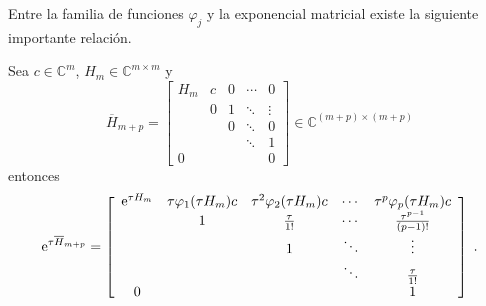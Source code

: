 Entre la familia de funciones $\varphi_j$ y la exponencial matricial existe la siguiente importante relación.
\begin{theorem}\label{theorem:exp-phi}
    \cite{sidje1998expokit} Sea $c\in\mathbb{C}^{m}$, $H_m\in\mathbb{C}^{m\times m}$ y 
    \begin{equation}
    \overline{H}_{m+p} = \left[\begin{array}{ccccc}
    H_m & c & 0 & \cdots & 0 \\
          & 0 & 1 & \ddots & \vdots \\
          &   & 0 & \ddots & 0 \\
          &   &   & \ddots & 1 \\
       0  &   &   &        & 0
    \end{array}\right]\in \mathbb{C}^{(m+p)\times(m+p)}
    \end{equation}
    entonces
     \begin{equation}
    \mathrm{e}^{\tau\overline{H}_{m+p}} = \left[\begin{array}{ccccc}
    \mathrm{e}^{\tau H_m} & \tau\varphi_1(\tau H_m)c & \tau^{2}\varphi_2(\tau H_m)c & \cdots & \tau^{p}\varphi_p(\tau H_m)c \\
      & 1 & \frac{\tau}{1!} & \cdots & \frac{\tau^{p-1}}{(p-1)!} \\
      &   & 1 & \ddots & \vdots \\
      &   &   & \ddots & \frac{\tau}{1!} \\
    0 &   &   &        & 1
    \end{array}\right]  \;.
    \end{equation}
\end{theorem} 